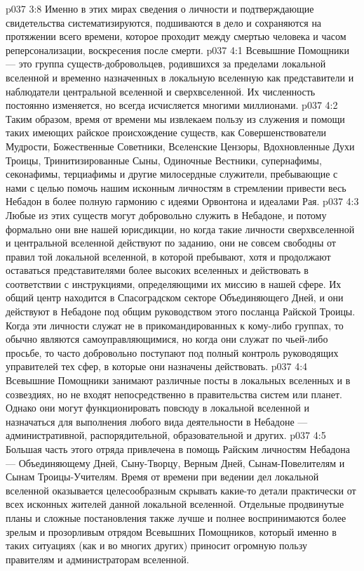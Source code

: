 \vs p037 3:8 Именно в этих мирах сведения о личности и подтверждающие свидетельства систематизируются, подшиваются в дело и сохраняются на протяжении всего времени, которое проходит между смертью человека и часом реперсонализации, воскресения после смерти.
\vs p037 4:1 Всевышние Помощники --- это группа существ\hyp{}добровольцев, родившихся за пределами локальной вселенной и временно назначенных в локальную вселенную как представители и наблюдатели центральной вселенной и сверхвселенной. Их численность постоянно изменяется, но всегда исчисляется многими миллионами.
\vs p037 4:2 Таким образом, время от времени мы извлекаем пользу из служения и помощи таких имеющих райское происхождение существ, как Совершенствователи Мудрости, Божественные Советники, Вселенские Цензоры, Вдохновленные Духи Троицы, Тринитизированные Сыны, Одиночные Вестники, супернафимы, секонафимы, терциафимы и другие милосердные служители, пребывающие с нами с целью помочь нашим исконным личностям в стремлении привести весь Небадон в более полную гармонию с идеями Орвонтона и идеалами Рая.
\vs p037 4:3 Любые из этих существ могут добровольно служить в Небадоне, и потому формально они вне нашей юрисдикции, но когда такие личности сверхвселенной и центральной вселенной действуют по заданию, они не совсем свободны от правил той локальной вселенной, в которой пребывают, хотя и продолжают оставаться представителями более высоких вселенных и действовать в соответствии с инструкциями, определяющими их миссию в нашей сфере. Их общий центр находится в Спасоградском секторе Объединяющего Дней, и они действуют в Небадоне под общим руководством этого посланца Райской Троицы. Когда эти личности служат не в прикомандированных к кому\hyp{}либо группах, то обычно являются самоуправляющимися, но когда они служат по чьей\hyp{}либо просьбе, то часто добровольно поступают под полный контроль руководящих управителей тех сфер, в которые они назначены действовать.
\vs p037 4:4 Всевышние Помощники занимают различные посты в локальных вселенных и в созвездиях, но не входят непосредственно в правительства систем или планет. Однако они могут функционировать повсюду в локальной вселенной и назначаться для выполнения любого вида деятельности в Небадоне --- административной, распорядительной, образовательной и других.
\vs p037 4:5 Большая часть этого отряда привлечена в помощь Райским личностям Небадона --- Объединяющему Дней, Сыну\hyp{}Творцу, Верным Дней, Сынам\hyp{}Повелителям и Сынам Троицы\hyp{}Учителям. Время от времени при ведении дел локальной вселенной оказывается целесообразным скрывать какие\hyp{}то детали практически от всех исконных жителей данной локальной вселенной. Отдельные продвинутые планы и сложные постановления также лучше и полнее воспринимаются более зрелым и прозорливым отрядом Всевышних Помощников, который именно в таких ситуациях (как и во многих других) приносит огромную пользу правителям и администраторам вселенной.
